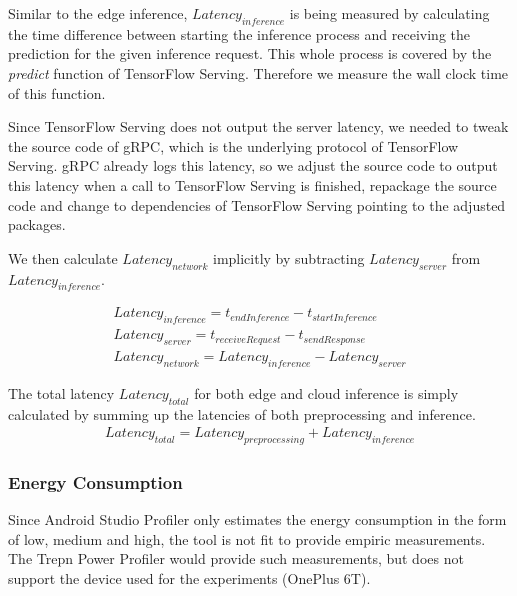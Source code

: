 Similar to the edge inference, $Latency_{inference}$ is being measured by calculating the time difference between starting the inference process and receiving the prediction for the given inference request. This whole process is covered by the \emph{predict} function of TensorFlow Serving. Therefore we measure the wall clock time of this function.

Since TensorFlow Serving does not output the server latency, we needed to tweak the source code of gRPC, which is the underlying protocol of TensorFlow Serving. gRPC already logs this latency, so we adjust the source code to output this latency when a call to TensorFlow Serving is finished, repackage the source code and change to dependencies of TensorFlow Serving pointing to the adjusted packages.

We then calculate $Latency_{network}$ implicitly by subtracting $Latency_{server}$ from $Latency_{inference}$.

\begin{equation*}
\begin{gathered}
Latency_{inference} = t_{endInference} - t_{startInference}\\
Latency_{server}= t_{receive Request} - t_{send Response}\\
Latency_{network} = Latency_{inference} - Latency_{server}
\end{gathered}
\end{equation*}


The total latency $Latency_{total}$ for both edge and cloud inference is simply calculated by summing up the latencies of both preprocessing and inference.
\begin{equation*}
\begin{gathered}
Latency_{total} = Latency_{preprocessing} + Latency_{inference}
\end{gathered}
\end{equation*}
\subsubsection{Energy Consumption}
Since Android Studio Profiler only estimates the energy consumption in the form of low, medium and high, the tool is not fit to provide empiric measurements. The Trepn Power Profiler would provide such measurements, but does not support the device used for the experiments (OnePlus 6T).
